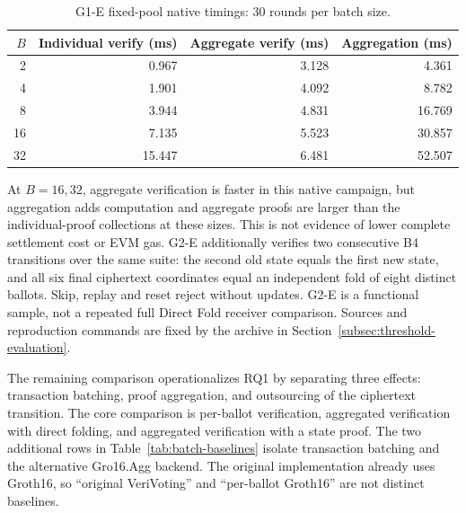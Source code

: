 \documentclass[pdflatex,sn-mathphys-num]{sn-jnl}%
\theoremstyle{thmstyleone}%
\theoremstyle{thmstyletwo}%
\theoremstyle{thmstylethree}%
\begin{document}
\begin{table}[htbp]
\centering
\caption{G1-E fixed-pool native timings: 30 rounds per batch size.}
\label{tab:native-batch-measured}
\small
\begin{tabular}{rrrr}
\toprule
$B$ & Individual verify (ms) & Aggregate verify (ms) & Aggregation (ms) \\
\midrule
2 & 0.967 & 3.128 & 4.361 \\
4 & 1.901 & 4.092 & 8.782 \\
8 & 3.944 & 4.831 & 16.769 \\
16 & 7.135 & 5.523 & 30.857 \\
32 & 15.447 & 6.481 & 52.507 \\
\bottomrule
\end{tabular}
\end{table}

At $B=16,32$, aggregate verification is faster in this native campaign,
but aggregation adds computation and aggregate proofs are larger than the
individual-proof collections at these sizes. This is not evidence of lower
complete settlement cost or EVM gas. G2-E additionally verifies two
consecutive B4 transitions over the same suite: the second old state equals
the first new state, and all six final ciphertext coordinates equal an
independent fold of eight distinct ballots. Skip, replay and reset reject
without updates. G2-E is a functional sample, not a repeated full Direct Fold
receiver comparison. Sources and reproduction commands are fixed by the
archive in Section~\ref{subsec:threshold-evaluation}.

The remaining comparison operationalizes RQ1
by separating three effects: transaction
batching, proof aggregation, and outsourcing of the ciphertext transition.
The core comparison is per-ballot verification, aggregated verification with
direct folding, and aggregated verification with a state proof.  The two
additional rows in Table~\ref{tab:batch-baselines} isolate transaction batching
and the alternative Gro16.Agg backend.  The original implementation already
uses Groth16, so ``original VeriVoting'' and ``per-ballot Groth16'' are not
distinct baselines.
\end{document}
